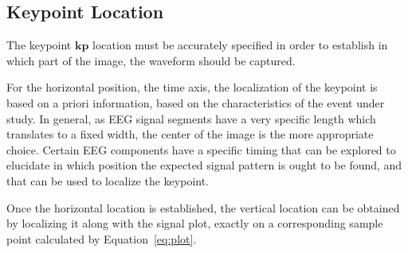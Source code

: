 \documentclass[review]{elsarticle}
\begin{document}
\subsection{Keypoint Location}
\label{keypointlocation}

%


The keypoint $\mathbf{kp}$ location must be accurately specified in order to establish in which part of the image, the waveform should be captured.

For the horizontal position, the time axis,  the localization of the keypoint is based on a priori information, based on the characteristics of the event under study.  In general, as EEG signal segments have a very specific length which translates to a fixed width, the center of the image is the more appropriate choice.   Certain EEG components have a specific timing that can be explored to elucidate in which position the expected signal pattern is ought to be found, and that can be used to localize the keypoint.



Once the horizontal location is established, the vertical location can be obtained by localizing it along with the signal plot, exactly on a corresponding sample point calculated by Equation~\ref{eq:plot}.  
\end{document}

